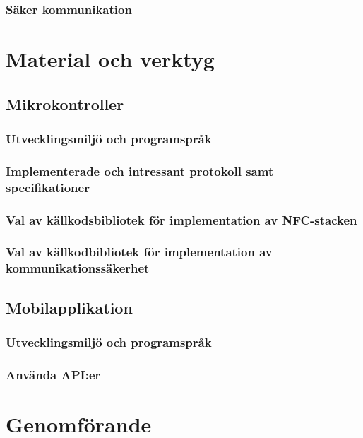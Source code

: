 \documentclass[11pt]{article}
\begin{document}
\subsubsection{Säker kommunikation}

\section{Material och verktyg}

\subsection{Mikrokontroller}

\subsubsection{Utvecklingsmiljö och programspråk}

\subsubsection{Implementerade och intressant protokoll samt specifikationer}

\subsubsection{Val av källkodsbibliotek för implementation av NFC-stacken}

\subsubsection{ Val av källkodbibliotek för implementation av kommunikationssäkerhet}

\subsection{Mobilapplikation}

\subsubsection{Utvecklingsmiljö och programspråk}

\subsubsection{Använda API:er}

\section{Genomförande}
\end{document}
